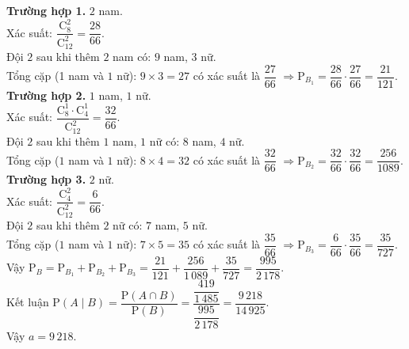 \begin{bt}
{		\textbf{Trường hợp  1.} $2$ nam.\\
		Xác  suất: $\dfrac{\mathrm{C}_8^2}{\mathrm{C}_{12}^2}=\dfrac{28}{66}$.\\
		Đội $2$ sau  khi thêm $2$ nam có: $9$ nam, $3$ nữ.\\
		Tổng cặp (1 nam và $1$ nữ): $9\times 3=27$ có xác suất là  $\dfrac{27}{66}$
		$\Rightarrow  \mathrm{P}_{B_1}=\dfrac{28}{66}\cdot\dfrac{27}{66}=\dfrac{21}{121}$.\\
		\textbf{Trường hợp  2.} $1$ nam, $1$ nữ.\\
		Xác suất: $\dfrac{\mathrm{C}_8^1\cdot  \mathrm{C}_4^1}{\mathrm{C}_{12}^2}=\dfrac{32}{66}$.\\
		Đội $2$ sau khi thêm $1$ nam, $1$ nữ  có: $8$ nam, $4$ nữ. \\
		Tổng cặp ($1$ nam và  $1$ nữ): $8\times 4=32$ có xác suất là $\dfrac{32}{66}$
		 $\Rightarrow \mathrm{P}_{B_2}=\dfrac{32}{66}\cdot\dfrac{32}{66}=\dfrac{256}{1089}$.\\
		\textbf{Trường  hợp 3.} $2$ nữ.\\
		 Xác suất: $\dfrac{\mathrm{C}_4^2}{\mathrm{C}_{12}^2}=\dfrac{6}{66}$.\\
		Đội $2$ sau khi thêm $2$ nữ có: $7$ nam,  $5$ nữ.\\
		Tổng cặp ($1$ nam và $1$  nữ): $7\times 5=35$ có xác suất là $\dfrac{35}{66}$
		$\Rightarrow  \mathrm{P}_{B_3}=\dfrac{6}{66}\cdot\dfrac{35}{66}=\dfrac{35}{727}$.\\
		Vậy $\mathrm{P}_{B}=\mathrm{P}_{B_1}+\mathrm{P}_{B_2}+\mathrm{P}_{B_3}=\dfrac{21}{121}+\dfrac{256}{1\,089}+\dfrac{35}{727}=\dfrac{995}{2\,178}$.\\ 
		 Kết luận
		$\mathrm{P}(A\mid  B)=\dfrac{\mathrm{P}(A\cap B)}{\mathrm{P}(B)}=\dfrac{\dfrac{419}{1\,485}}{\dfrac{995}{2\,178}}=\dfrac{9\,218}{14\,925}.$ \\
	Vậy $a=9\,218$.} 
\end{bt}

